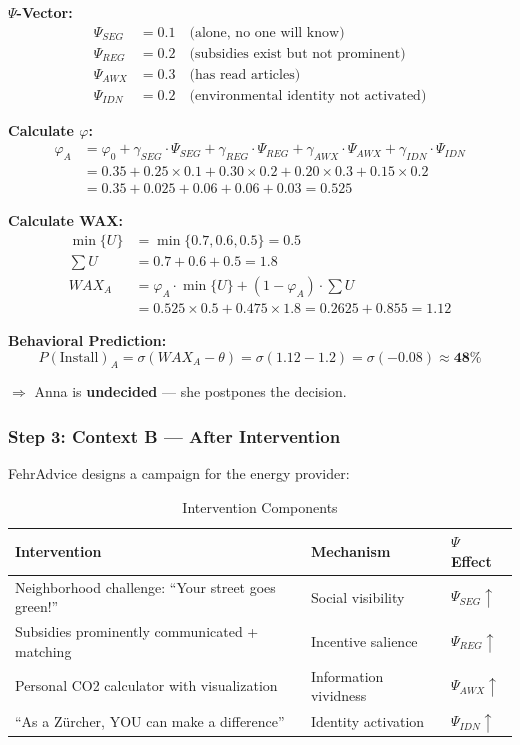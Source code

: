 \textbf{$\Psi$-Vector:}
\begin{align*}
\Psi_{SEG} &= 0.1 \quad \text{(alone, no one will know)} \\
\Psi_{REG} &= 0.2 \quad \text{(subsidies exist but not prominent)} \\
\Psi_{AWX} &= 0.3 \quad \text{(has read articles)} \\
\Psi_{IDN} &= 0.2 \quad \text{(environmental identity not activated)}
\end{align*}

\textbf{Calculate $\varphi$:}
\begin{align}
\varphi_A &= \varphi_0 + \gamma_{SEG} \cdot \Psi_{SEG} + \gamma_{REG} \cdot \Psi_{REG} + \gamma_{AWX} \cdot \Psi_{AWX} + \gamma_{IDN} \cdot \Psi_{IDN} \nonumber \\
&= 0.35 + 0.25 \times 0.1 + 0.30 \times 0.2 + 0.20 \times 0.3 + 0.15 \times 0.2 \nonumber \\
&= 0.35 + 0.025 + 0.06 + 0.06 + 0.03 = \mathbf{0.525}
\end{align}

\textbf{Calculate WAX:}
\begin{align}
\min\{U\} &= \min\{0.7, 0.6, 0.5\} = 0.5 \\
\sum U &= 0.7 + 0.6 + 0.5 = 1.8 \\
WAX_A &= \varphi_A \cdot \min\{U\} + (1-\varphi_A) \cdot \sum U \nonumber \\
&= 0.525 \times 0.5 + 0.475 \times 1.8 = 0.2625 + 0.855 = \mathbf{1.12}
\end{align}

\textbf{Behavioral Prediction:}
\begin{equation}
P(\text{Install})_A = \sigma(WAX_A - \theta) = \sigma(1.12 - 1.2) = \sigma(-0.08) \approx \mathbf{48\%}
\end{equation}

$\Rightarrow$ Anna is \textbf{undecided} --- she postpones the decision.

\subsubsection{Step 3: Context B --- After Intervention}

FehrAdvice designs a campaign for the energy provider:

\begin{table}[htbp]
\centering
\caption{Intervention Components}
\begin{tabular}{@{}lll@{}}
\toprule
\textbf{Intervention} & \textbf{Mechanism} & \textbf{$\Psi$ Effect} \\
\midrule
Neighborhood challenge: ``Your street goes green!'' & Social visibility & $\Psi_{SEG} \uparrow$ \\
Subsidies prominently communicated + matching & Incentive salience & $\Psi_{REG} \uparrow$ \\
Personal CO2 calculator with visualization & Information vividness & $\Psi_{AWX} \uparrow$ \\
``As a Zürcher, YOU can make a difference'' & Identity activation & $\Psi_{IDN} \uparrow$ \\
\bottomrule
\end{tabular}
\end{table}

